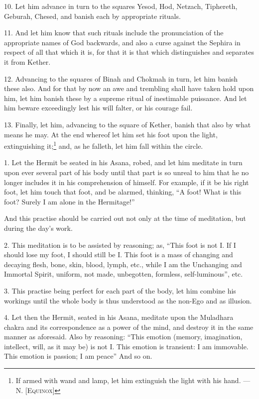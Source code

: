 10. Let him advance in turn to the squares Yesod, Hod, Netzach, Tiphereth, Geburah, Chesed, and banish each by appropriate rituals.

11. And let him know that such rituals include the pronunciation of the appropriate names of God backwards, and also a curse against the Sephira in respect of all that which it is, for that it is that which distinguishes and separates it from Kether.

12. Advancing to the squares of Binah and Chokmah in turn, let him banish these also. And for that by now an awe and trembling shall have taken hold upon him, let him banish these by a supreme ritual of inestimable puissance. And let him beware exceedingly lest his will falter, or his courage fail.

13. Finally, let him, advancing to the square of Kether, banish that also by what means he may. At the end whereof let him set his foot upon the light, extinguishing it;\footnote{If armed with wand and lamp, let him extinguish the light with his hand. --- N. \textsc{[Equinox]}} and, as he falleth, let him fall within the circle.


1. Let the Hermit be seated in his Asana, robed, and let him meditate in turn upon ever several part of his body until that part is so unreal to him that he no longer includes it in his comprehension of himself. For example, if it be his right foot, let him touch that foot, and be alarmed, thinking, \enquote{A foot! What is this foot? Surely I am alone in the Hermitage!}

And this practise should be carried out not only at the time of meditation, but during the day's work.

2. This meditation is to be assisted by reasoning; as, \enquote{This foot is not I. If I should lose my foot, I should still be I. This foot is a mass of changing and decaying flesh, bone, skin, blood, lymph, etc., while I am the Unchanging and Immortal Spirit, uniform, not made, unbegotten, formless, self-luminous}, etc.

3. This practise being perfect for each part of the body, let him combine his workings until the whole body is thus understood as the non-Ego and as illusion.

4. Let then the Hermit, seated in his Asana, meditate upon the Muladhara chakra and its correspondence as a power of the mind, and destroy it in the same manner as aforesaid. Also by reasoning: \enquote{This emotion (memory, imagination, intellect, will, as it may be) is not I. This emotion is transient: I am immovable. This emotion is passion; I am peace} And so on.

